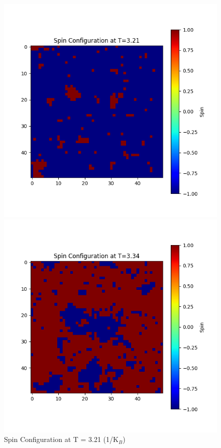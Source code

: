 \documentclass[11pt]{article}
\begin{document}
\begin{figure}[H]
    \centering
    \begin{minipage}{0.32\textwidth}
        \centering
        \includegraphics[width=\textwidth]{Spin_Configuration_at_T=3.21.png}
        \caption{Spin Configuration at T = 3.21 (1/K$_B$)}
        \label{fig:10}
    \end{minipage}
    \begin{minipage}{0.32\textwidth}
        \centering
        \includegraphics[width=\textwidth]{Spin_Configuration_at_T=3.34.png}

\end{minipage}
\end{figure}
\end{document}
